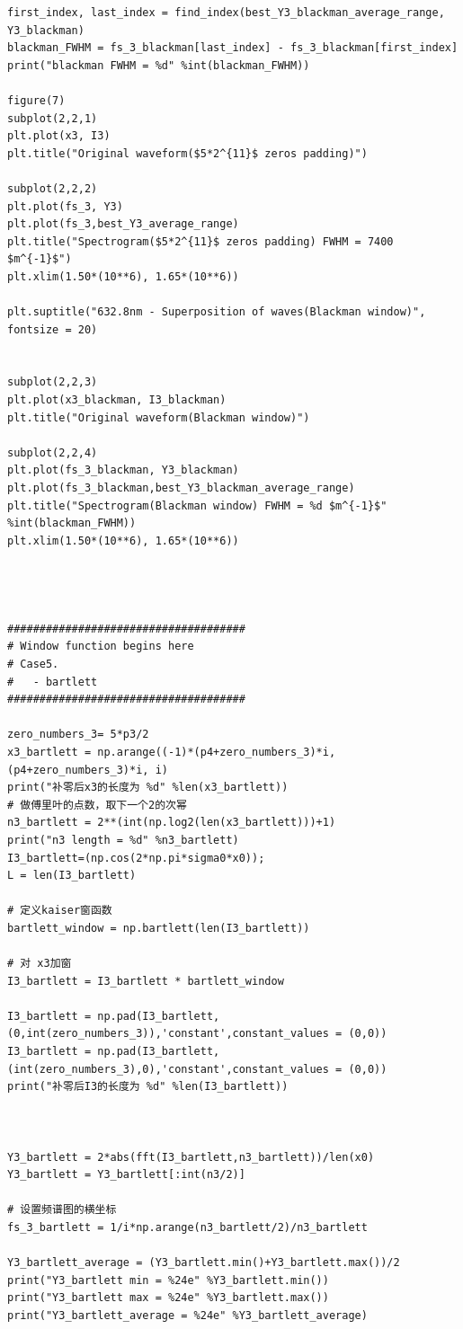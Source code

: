 \documentclass[conference]{IEEEtran}
\begin{document}
\begin{lstlisting}
first_index, last_index = find_index(best_Y3_blackman_average_range, Y3_blackman)
blackman_FWHM = fs_3_blackman[last_index] - fs_3_blackman[first_index]
print("blackman FWHM = %d" %int(blackman_FWHM))

figure(7)
subplot(2,2,1)
plt.plot(x3, I3)
plt.title("Original waveform($5*2^{11}$ zeros padding)")

subplot(2,2,2)
plt.plot(fs_3, Y3)
plt.plot(fs_3,best_Y3_average_range)
plt.title("Spectrogram($5*2^{11}$ zeros padding) FWHM = 7400 $m^{-1}$")
plt.xlim(1.50*(10**6), 1.65*(10**6))

plt.suptitle("632.8nm - Superposition of waves(Blackman window)", fontsize = 20)


subplot(2,2,3)
plt.plot(x3_blackman, I3_blackman)
plt.title("Original waveform(Blackman window)")

subplot(2,2,4)
plt.plot(fs_3_blackman, Y3_blackman)
plt.plot(fs_3_blackman,best_Y3_blackman_average_range)
plt.title("Spectrogram(Blackman window) FWHM = %d $m^{-1}$" %int(blackman_FWHM))
plt.xlim(1.50*(10**6), 1.65*(10**6))




#####################################
# Window function begins here
# Case5.
#   - bartlett
#####################################

zero_numbers_3= 5*p3/2
x3_bartlett = np.arange((-1)*(p4+zero_numbers_3)*i, (p4+zero_numbers_3)*i, i)
print("补零后x3的长度为 %d" %len(x3_bartlett)) 
# 做傅里叶的点数，取下一个2的次幂
n3_bartlett = 2**(int(np.log2(len(x3_bartlett)))+1)
print("n3 length = %d" %n3_bartlett)
I3_bartlett=(np.cos(2*np.pi*sigma0*x0));
L = len(I3_bartlett)

# 定义kaiser窗函数
bartlett_window = np.bartlett(len(I3_bartlett))

# 对 x3加窗
I3_bartlett = I3_bartlett * bartlett_window

I3_bartlett = np.pad(I3_bartlett,(0,int(zero_numbers_3)),'constant',constant_values = (0,0))
I3_bartlett = np.pad(I3_bartlett,(int(zero_numbers_3),0),'constant',constant_values = (0,0))
print("补零后I3的长度为 %d" %len(I3_bartlett)) 



Y3_bartlett = 2*abs(fft(I3_bartlett,n3_bartlett))/len(x0)
Y3_bartlett = Y3_bartlett[:int(n3/2)]

# 设置频谱图的横坐标
fs_3_bartlett = 1/i*np.arange(n3_bartlett/2)/n3_bartlett

Y3_bartlett_average = (Y3_bartlett.min()+Y3_bartlett.max())/2
print("Y3_bartlett min = %24e" %Y3_bartlett.min())
print("Y3_bartlett max = %24e" %Y3_bartlett.max())
print("Y3_bartlett_average = %24e" %Y3_bartlett_average)


\end{lstlisting}
\end{document}
